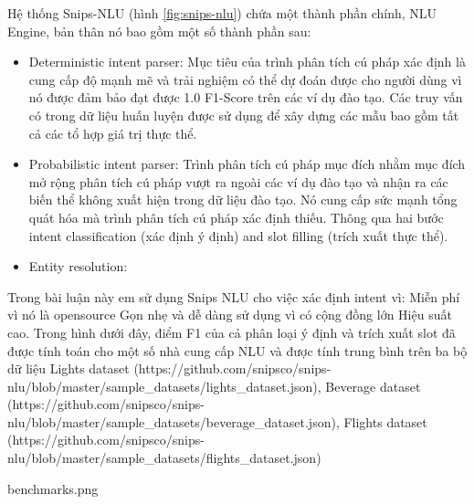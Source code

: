 \begin{itemize}
          Hệ thống Snips-NLU (hình \ref{fig:snips-nlu}) chứa một thành phần chính, NLU Engine, bản thân nó bao gồm một số thành phần sau:
          \begin{itemize}
              \item Deterministic intent parser: Mục tiêu của trình phân tích cú pháp xác định là cung cấp độ mạnh mẽ và trải nghiệm có thể dự đoán được cho người dùng vì nó được đảm bảo đạt được 1.0 F1-Score trên các ví dụ đào tạo. Các truy vấn có trong dữ liệu huấn luyện được sử dụng để xây dựng các mẫu bao gồm tất cả các tổ hợp giá trị thực thể.
              \item Probabilistic intent parser: Trình phân tích cú pháp mục đích nhằm mục đích mở rộng phân tích cú pháp vượt ra ngoài các ví dụ đào tạo và nhận ra các biến thể không xuất hiện trong dữ liệu đào tạo. Nó cung cấp sức mạnh tổng quát hóa mà trình phân tích cú pháp xác định thiếu. Thông qua hai bước intent classification (xác định ý định) and slot filling (trích xuất thực thể).
              \item Entity resolution:
          \end{itemize}
\end{itemize}

Trong bài luận này em sử dụng Snips NLU cho việc xác định intent vì:
	Miễn phí vì nó là opensource
	Gọn nhẹ và dễ dàng sử dụng vì có cộng đồng lớn
	Hiệu suất cao.
	Trong hình dưới đây, điểm F1 của cả phân loại ý định và trích xuất slot đã được tính toán cho một số nhà cung cấp NLU và được tính trung bình trên ba bộ dữ liệu Lights dataset (https://github.com/snipsco/snips-nlu/blob/master/sample_datasets/lights_dataset.json), Beverage dataset (https://github.com/snipsco/snips-nlu/blob/master/sample_datasets/beverage_dataset.json), Flights dataset (https://github.com/snipsco/snips-nlu/blob/master/sample_datasets/flights_dataset.json)
	
benchmarks.png
	
